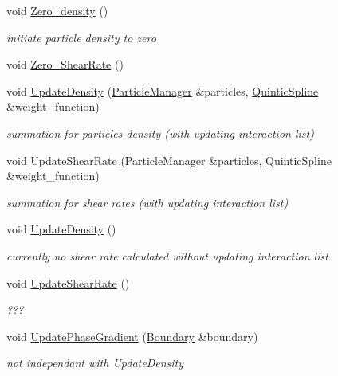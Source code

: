 \begin{CompactItemize}
void \hyperlink{classHydrodynamics_13810b3b4110a2b931bf7426af2f9bcf}{Zero\_\-density} ()
\begin{CompactList}\small\item\em initiate particle density to zero \item\end{CompactList}\item 
void \hyperlink{classHydrodynamics_049f88c2f97863edae4489618dc9e853}{Zero\_\-ShearRate} ()
\item 
void \hyperlink{classHydrodynamics_1818eb1f9044ae980e92c70146e51c5b}{UpdateDensity} (\hyperlink{classParticleManager}{ParticleManager} \&particles, \hyperlink{classQuinticSpline}{QuinticSpline} \&weight\_\-function)
\begin{CompactList}\small\item\em summation for particles density (with updating interaction list) \item\end{CompactList}\item 
void \hyperlink{classHydrodynamics_7ae4f1005699f13414ec6c487bac0ee0}{UpdateShearRate} (\hyperlink{classParticleManager}{ParticleManager} \&particles, \hyperlink{classQuinticSpline}{QuinticSpline} \&weight\_\-function)
\begin{CompactList}\small\item\em summation for shear rates (with updating interaction list) \item\end{CompactList}\item 
void \hyperlink{classHydrodynamics_b6cab35a4d7adf70657ef16b9ec4dafd}{UpdateDensity} ()
\begin{CompactList}\small\item\em currently no shear rate calculated without updating interaction list \item\end{CompactList}\item 
void \hyperlink{classHydrodynamics_49570aaeedea32d7a2baf0532880b2e8}{UpdateShearRate} ()
\begin{CompactList}\small\item\em ??? \item\end{CompactList}\item 
void \hyperlink{classHydrodynamics_939e9b2ec26b3e4a2eaf2683e5f0343d}{UpdatePhaseGradient} (\hyperlink{classBoundary}{Boundary} \&boundary)
\begin{CompactList}\small\item\em not independant with UpdateDensity \item\end{CompactList}\item 

\end{CompactItemize}
